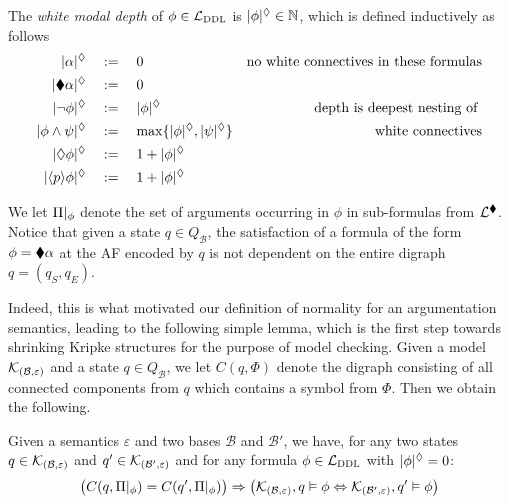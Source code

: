\documentclass{llncs}
\newcommand{\comp}[2]{C(#1,#2)}
\newcommand{\dlangm}{{\mathcal L}_{\acro{DDL}}}
\newcommand{\carriers}[1]{Q_{#1}}
\newcommand{\kmod}[2]{{\cal K}_{(#1,#2)}}
\newcommand{\views}{\mathcal B}
\newcommand{\sem}{\varepsilon}
\newcommand{\depth}[1]{|{#1}|^\adia}
\begin{document}
\begin{definition}\label{def:depth} The \emph{white modal depth} of $\phi \in \dlangm$ is $\depth{\phi} \in \mathbb N$, which is defined inductively as follows 
\begin{align*}
\depth{\alpha} \quad & := \quad 0 & \text{no white connectives in these formulas}\\
\depth{\cdia \alpha} \quad & := \quad 0 \\
\depth{\neg \phi} \quad &:= \quad \depth{\phi} & \text{depth is deepest nesting of }\\
\depth{\phi \wedge \psi} \quad &:= \quad \max\{\depth{\phi}, \depth{\psi}\} & \text{white connectives}\\
\depth{\adia \phi} \quad &:= \quad 1 + \depth{\phi} \\
\depth{\ddia p \phi} \quad &:= \quad 1 + \depth{\phi} \\
\end{align*}
\end{definition}

We let ${\Pi}|_{\phi}$ denote the set of arguments occurring in $\phi$ in sub-formulas from $\mathcal L^{\blacklozenge}$. Notice that given a state $q \in \carriers \views$, the satisfaction of a formula of the form  $\phi = \blacklozenge \alpha$ at the AF encoded by $q$ is not dependent on the entire digraph $q = (q_S,q_E)$.

Indeed, this is what motivated our definition of normality for an argumentation semantics, leading to the following simple lemma, which is the first step towards shrinking Kripke structures for the purpose of model checking. Given a model $\kmod \views \sem$ and a state $q \in \carriers \views$, we let $\comp q \Phi$ denote the digraph consisting of all connected components from $q$ which contains a symbol from $\Phi$. Then we obtain the following.

\begin{lemma}\label{lemma:comp}Given a semantics $\sem$ and two bases $\views$ and $\views'$, we have, for any two states $q \in \kmod \views \sem$ and $q' \in \kmod {\views'} \sem$ and for any formula $\phi \in \dlangm$ with $\depth \phi = 0$:
$$
\big(\comp q {\restr \Pi \phi} = \comp {q'} {\restr \Pi \phi}\big) \Rightarrow \big(\kmod \views \sem,q \vDash \phi \Leftrightarrow \kmod {\views'} \sem, q'  \vDash \phi \big)$$
\end{lemma}
\end{document}
